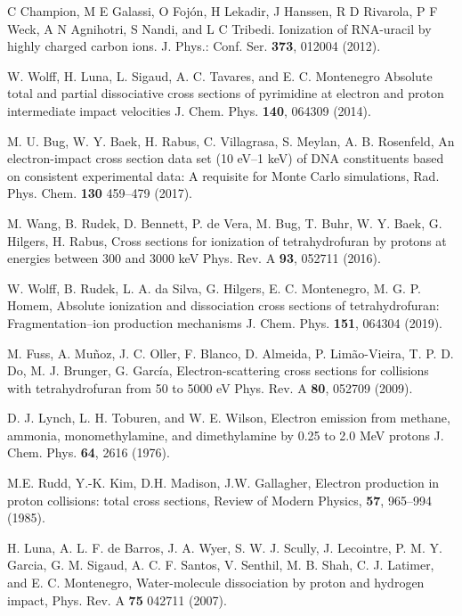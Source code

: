 \documentclass[preprint,showpacs]{revtex4}
\begin{document}
\begin{thebibliography}{99}
C Champion, M E Galassi, O Foj\'{o}n, H Lekadir, J Hanssen, R D Rivarola,
P F Weck, A N Agnihotri, S Nandi, and L C Tribedi. 
Ionization of RNA-uracil by highly charged carbon ions.
J. Phys.: Conf. Ser. \textbf{373}, 012004 (2012).

W. Wolff, H. Luna, L. Sigaud, A. C. Tavares, and E. C. Montenegro
Absolute total and partial dissociative cross sections of pyrimidine
at electron and proton intermediate impact velocities
J. Chem. Phys. \textbf{140}, 064309 (2014).

M. U. Bug, W. Y. Baek, H. Rabus, C. Villagrasa, S. Meylan, A. B. Rosenfeld,
An electron-impact cross section data set (10 eV--1 keV) of DNA
constituents based on consistent experimental data: A requisite for 
Monte Carlo simulations,
Rad. Phys. Chem. \textbf{130} 459--479 (2017).

M. Wang, B. Rudek, D. Bennett, P. de Vera, M. Bug, T. Buhr, W. Y. Baek, 
G. Hilgers, H. Rabus, 
Cross sections for ionization of tetrahydrofuran by protons at energies 
between 300 and 3000 keV
Phys. Rev. A \textbf{93}, 052711 (2016).

W. Wolff, B. Rudek, L. A. da Silva, G. Hilgers, E. C. Montenegro, 
M. G. P. Homem,
Absolute ionization and dissociation cross sections of tetrahydrofuran:
Fragmentation--ion production mechanisms
J. Chem. Phys. \textbf{151}, 064304 (2019).

M. Fuss, A. Muñoz, J. C. Oller, F. Blanco, D. Almeida, P. Limão-Vieira, 
T. P. D. Do, M. J. Brunger, G. Garc\'{i}a,
Electron-scattering cross sections for collisions with tetrahydrofuran 
from 50 to 5000 eV
Phys. Rev. A \textbf{80}, 052709 (2009).

D. J. Lynch, L. H. Toburen, and W. E. Wilson,
Electron emission from methane, ammonia, monomethylamine, and
dimethylamine by 0.25 to 2.0 MeV protons
J. Chem. Phys. \textbf{64}, 2616 (1976).

M.E. Rudd, Y.-K. Kim, D.H. Madison, J.W. Gallagher,
Electron production in proton collisions: total cross sections,
Review of Modern Physics, \textbf{57}, 965--994 (1985).

H. Luna, A. L. F. de Barros, J. A. Wyer, S. W. J. Scully, J. Lecointre, 
P. M. Y. Garcia, G. M. Sigaud, A. C. F. Santos, V. Senthil, M. B. Shah, 
C. J. Latimer, and E. C. Montenegro,
Water-molecule dissociation by proton and hydrogen impact,
Phys. Rev. A \textbf{75} 042711 (2007).


\end{thebibliography}
\end{document}
